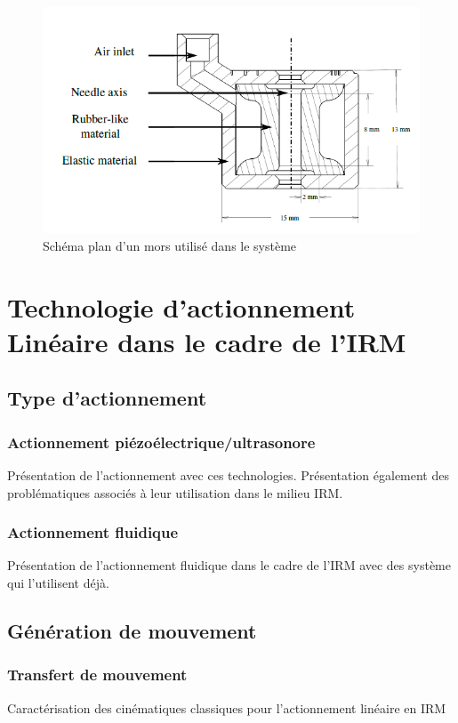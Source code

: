 \documentclass[10pt, a4paper]{article}
\begin{document}
\begin{figure}[ht!]
\centering
\includegraphics[scale=0.5]{ImageIntro/mors.PNG}
\caption{ Schéma plan d'un mors utilisé dans le système }
\label{fig:mors}
\end{figure} 

\section{Technologie d'actionnement Linéaire dans le cadre de l'IRM}
    \subsection{Type d'actionnement}
        \subsubsection{Actionnement piézoélectrique/ultrasonore}
            Présentation de l'actionnement avec ces technologies. Présentation également des problématiques associés à leur utilisation dans le milieu IRM.
        \subsubsection{Actionnement fluidique}
            Présentation de l'actionnement fluidique dans le cadre de l'IRM avec des système qui l'utilisent déjà.
    \subsection{Génération de mouvement}
        \subsubsection{Transfert de mouvement}
        Caractérisation des cinématiques classiques pour l'actionnement linéaire en IRM
\end{document}

